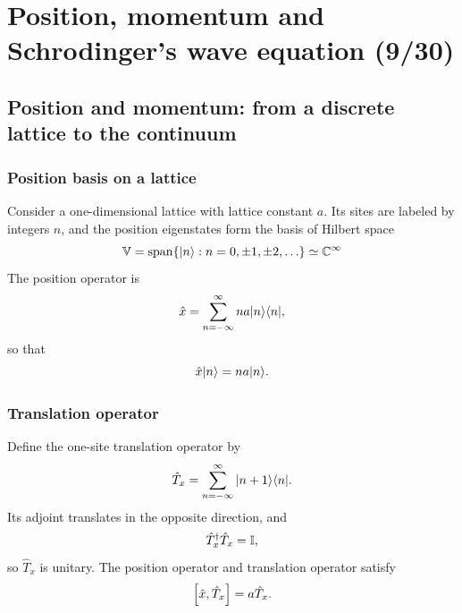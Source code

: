 \section{Position, momentum and Schrodinger's wave equation (9/30)}


\subsection{Position and momentum: from a discrete lattice to the continuum}

\subsubsection{Position basis on a lattice}
Consider a one-dimensional lattice with lattice constant $a$. Its sites are
labeled by integers $n$, and the position eigenstates form the basis of Hilbert space
\begin{equation}
 \mathbb{V}=\operatorname{span}\{|{n}\rangle:n=0,\pm1,\pm2,\ldots\}\simeq\mathbb{C}^\infty
\end{equation}
The position operator is
\begin{equation}
 \hat{x}=\sum_{n=-\infty}^{\infty}na|n\rangle\langle n|,
\end{equation}
so that
\begin{equation}
 \hat{x}|{n}\rangle=na|{n}\rangle.
\end{equation}

\subsubsection{Translation operator}
Define the one-site translation operator by
\begin{equation}
 \hat{T}_x=\sum_{n=-\infty}^{\infty}|{n+1}\rangle\langle{n}|.
\end{equation}
Its adjoint translates in the opposite direction, and
\begin{equation}
 \hat{T}_x^\dagger\hat{T}_x=\mathbb{I},
\end{equation}
so $\hat{T}_x$ is unitary. The position operator and translation operator
satisfy
\begin{equation}
 \left[\hat{x},\hat{T}_x\right]=a\hat{T}_x.
\end{equation}


